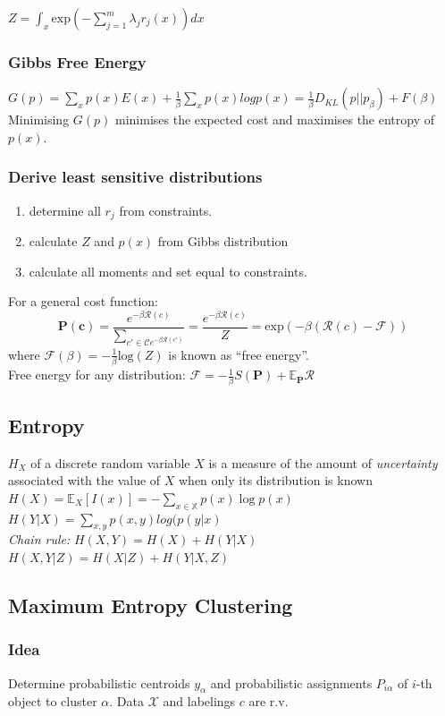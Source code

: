 \documentclass[9pt,parskip]{scrartcl}
\begin{document}
\begin{multicols*}{4}
$Z = \int_x \text{exp}(- \sum_{j=1}^m \lambda_j r_j(x)) dx$
\subsubsection*{Gibbs Free Energy}
$G(p) = \sum_x p(x) E(x) + \frac{1}{\beta} \sum_x p(x)log p(x) = \frac{1}{\beta} D_{KL}(p||p_{\beta}) + F(\beta)$
Minimising $G(p)$ minimises the expected cost and maximises the entropy of $p(x)$.
\subsubsection*{Derive least sensitive distributions}
\begin{enumerate}
	\item determine all $r_j$ from constraints.
	\item calculate $Z$ and $p(x)$ from Gibbs distribution
	\item calculate all moments and set equal to constraints.
\end{enumerate}

For a general cost function:
\[\mathbf{P}(\mathbf{c}) = \frac{e^{-\beta \mathcal{R}(c)}}{\sum_{c' \in \mathcal{C} e^{-\beta \mathcal{R}(c')}}} = \frac{e^{-\beta \mathcal{R}(c)}}{Z} = \text{exp}(- \beta (\mathcal{R}(c)- \mathcal{F})) \]
where $\mathcal{F}(\beta) = -\frac 1 \beta \text{log}(Z)$ is known as "`free energy"'. \\
Free energy for any distribution: $\mathcal{F} = - \frac 1 \beta S(\mathbf{P}) + \mathbb{E}_{\mathbf{P}} \mathcal{R} $
\subsection*{Entropy}
$H_X$ of a discrete random variable $X$ is a measure of the amount of \textit{uncertainty} associated with the value of $X$ when only its distribution is known \\
$H(X)=\mathbb {E} _{X}[I(x)]=-\sum _{x\in \mathbb {X} }p(x)\log p(x)$ \\
$H(Y|X) = \sum_{x,y} p(x,y)log(p(y|x)$\\
\textit{Chain rule: } $ H(X,Y) = H(X) + H(Y|X) $ \\

$H(X,Y|Z) = H(X|Z) + H(Y|X,Z)$

\subsection*{Maximum Entropy Clustering}
\subsubsection*{Idea}
Determine probabilistic centroids $y_{\alpha}$ and probabilistic assignments $P_{i \alpha}$ of $i$-th object to cluster $\alpha$. Data $\mathcal{X}$ and labelings $c$ are r.v.


\end{multicols*}
\end{document}
